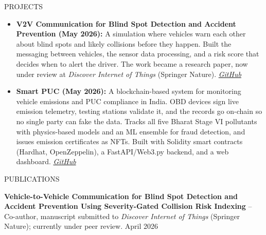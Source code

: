 \documentclass{resume} %
\begin{document}
\begin{rSection}{PROJECTS}
\begin{itemize}
\item \textbf{V2V Communication for Blind Spot Detection and Accident Prevention (May 2026):} A simulation where vehicles warn each other about blind spots and likely collisions before they happen. Built the messaging between vehicles, the sensor data processing, and a risk score that decides when to alert the driver. The work became a research paper, now under review at \textit{Discover Internet of Things} (Springer Nature). \href{https://github.com/omkarrr88/V2V}{\textit{GitHub}}

\item \textbf{Smart PUC (May 2026):} A blockchain-based system for monitoring vehicle emissions and PUC compliance in India. OBD devices sign live emission telemetry, testing stations validate it, and the records go on-chain so no single party can fake the data. Tracks all five Bharat Stage VI pollutants with physics-based models and an ML ensemble for fraud detection, and issues emission certificates as NFTs. Built with Solidity smart contracts (Hardhat, OpenZeppelin), a FastAPI/Web3.py backend, and a web dashboard. \href{https://github.com/omkarrr88/Smart_PUC}{\textit{GitHub}}

\end{itemize}

\end{rSection}


\begin{rSection}{PUBLICATIONS}

\textbf{Vehicle-to-Vehicle Communication for Blind Spot Detection and Accident Prevention Using Severity-Gated Collision Risk Indexing} -- Co-author, manuscript submitted to \textit{Discover Internet of Things} (Springer Nature); currently under peer review. \hfill {April 2026}

\end{rSection}

\end{document}
